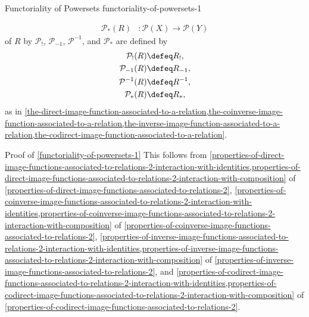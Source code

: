 \begin{proposition}{Functoriality of Powersets \rmI}{functoriality-of-powersets-1}
\begin{itemize}
\begin{align*}
                \mathcal{P}_{*}(R)  &\colon \mathcal{P}(X) \to \mathcal{P}(Y)%
            \end{align*}
            of $R$ by $\mathcal{P}_{!}$, $\mathcal{P}_{-1}$, $\mathcal{P}^{-1}$, and $\mathcal{P}_{*}$ are defined by
            \begin{align*}
                \mathcal{P}_{!}(R)  &\defeq R_{!},\\%
                \mathcal{P}_{-1}(R) &\defeq R_{-1},\\%
                \mathcal{P}^{-1}(R) &\defeq R^{-1},\\%
                \mathcal{P}_{*}(R)  &\defeq R_{*},%
            \end{align*}
            as in \cref{the-direct-image-function-associated-to-a-relation,the-coinverse-image-function-associated-to-a-relation,the-inverse-image-function-associated-to-a-relation,the-codirect-image-function-associated-to-a-relation}.
    \end{itemize}
\end{proposition}
\begin{Proof}{Proof of \cref{functoriality-of-powersets-1}}%
    This follows from \cref{properties-of-direct-image-functions-associated-to-relations-2-interaction-with-identities,properties-of-direct-image-functions-associated-to-relations-2-interaction-with-composition} of \cref{properties-of-direct-image-functions-associated-to-relations-2}, \cref{properties-of-coinverse-image-functions-associated-to-relations-2-interaction-with-identities,properties-of-coinverse-image-functions-associated-to-relations-2-interaction-with-composition} of \cref{properties-of-coinverse-image-functions-associated-to-relations-2}, \cref{properties-of-inverse-image-functions-associated-to-relations-2-interaction-with-identities,properties-of-inverse-image-functions-associated-to-relations-2-interaction-with-composition} of \cref{properties-of-inverse-image-functions-associated-to-relations-2}, and \cref{properties-of-codirect-image-functions-associated-to-relations-2-interaction-with-identities,properties-of-codirect-image-functions-associated-to-relations-2-interaction-with-composition} of \cref{properties-of-codirect-image-functions-associated-to-relations-2}.
\end{Proof}
